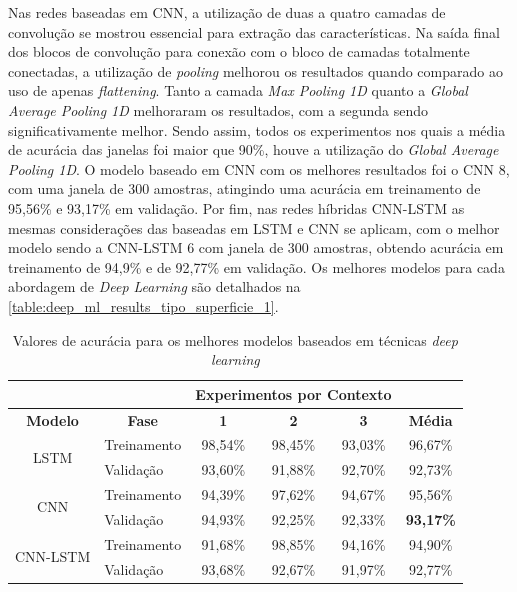 Nas redes baseadas em CNN, a utilização de duas a quatro camadas de convolução se mostrou essencial para extração das características. Na saída final dos blocos de convolução para conexão com o bloco de camadas totalmente conectadas, a utilização de \textit{pooling} melhorou os resultados quando comparado ao uso de apenas \textit{flattening}. Tanto a camada \textit{Max Pooling 1D} quanto a \textit{Global Average Pooling 1D} melhoraram os resultados, com a segunda sendo significativamente melhor. Sendo assim, todos os experimentos nos quais a média de acurácia das janelas foi maior que 90\%, houve a utilização do \textit{Global Average Pooling 1D}. O modelo baseado em CNN com os melhores resultados foi o CNN 8, com uma janela de 300 amostras, atingindo uma acurácia em treinamento de 95,56\% e 93,17\% em validação. Por fim, nas redes híbridas CNN-LSTM as mesmas considerações das baseadas em LSTM e CNN se aplicam, com o melhor modelo sendo a CNN-LSTM 6 com janela de 300 amostras, obtendo acurácia em treinamento de 94,9\% e de 92,77\% em validação. Os melhores modelos para cada abordagem de \textit{Deep Learning} são detalhados na \autoref{table:deep_ml_results_tipo_superficie_1}.

\begin{table}[H]
\scriptsize
\centering
\caption{Valores de acurácia para os melhores modelos baseados em técnicas \textit{deep learning}} 
\label{table:deep_ml_results_tipo_superficie_1}
\begin{tabular}{clcccc}
\cmidrule(lr){3-5}
& & \multicolumn{3}{c}{\textbf{Experimentos por Contexto}} & \multicolumn{1}{c}{} \\ \midrule
\textbf{Modelo} & \multicolumn{1}{c}{\textbf{Fase}} & \textbf{1} & \textbf{2} & \textbf{3} & \textbf{Média} \\ \midrule
\multirow{2}{*}{LSTM} & Treinamento & 98,54\% & 98,45\% & 93,03\% & 96,67\% \\ \cmidrule(l){2-6} 
 & Validação & 93,60\% & 91,88\% & 92,70\% & 92,73\% \\ \midrule
\multirow{2}{*}{CNN} & Treinamento & 94,39\% & 97,62\% & 94,67\% & 95,56\% \\ \cmidrule(l){2-6} 
 & Validação & 94,93\% & 92,25\% & 92,33\% & \cellcolor[HTML]{34FF34}\textbf{93,17\%} \\ \midrule
\multirow{2}{*}{CNN-LSTM} & Treinamento & 91,68\% & 98,85\% & 94,16\% & 94,90\% \\ \cmidrule(l){2-6} 
 & Validação & 93,68\% & 92,67\% & 91,97\% & 92,77\% \\ \bottomrule
\end{tabular}
\end{table}

